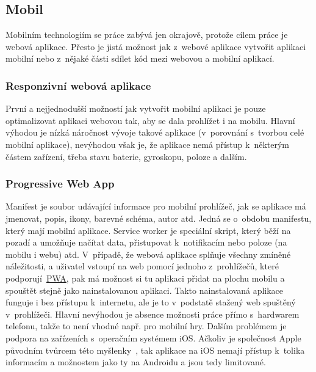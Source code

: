 \subsection{Mobil}
\label{ss:mobile}
Mobilním technologiím se práce zabývá jen okrajově, protože cílem práce je webová aplikace. Přesto je jistá možnost jak z~webové aplikace vytvořit aplikaci mobilní nebo z~nějaké části sdílet kód mezi webovou a mobilní aplikací.

\subsubsection*{Responzivní webová aplikace}
\label{sss:responsive_web_app}
První a nejjednodušší možností jak vytvořit mobilní aplikaci je pouze optimalizovat aplikaci webovou tak, aby se dala prohlížet i na mobilu. Hlavní výhodou je nízká náročnost vývoje takové aplikace (v~porovnání s~tvorbou celé mobilní aplikace), nevýhodou však je, že aplikace nemá přístup k~některým částem zařízení, třeba stavu baterie, gyroskopu, poloze a dalším.

\subsubsection*{Progressive Web App}
\label{sss:pwa}
Manifest je soubor udávající informace pro mobilní prohlížeč, jak se aplikace má jmenovat, popis, ikony, barevné schéma, autor atd. Jedná se o~obdobu manifestu, který mají mobilní aplikace. Service worker je speciální skript, který běží na pozadí a umožňuje načítat data, přistupovat k~notifikacím nebo poloze (na mobilu i webu) atd. V~případě, že webová aplikace splňuje všechny zmíněné náležitosti, a uživatel vstoupí na web pomocí jednoho z~prohlížečů, které podporují~\hyperref[sss:pwa]{PWA}, pak má možnost si tu aplikaci přidat na plochu mobilu a spouštět stejně jako nainstalovanou aplikaci. Takto nainstalovaná aplikace funguje i bez přístupu k~internetu, ale je to v~podstatě stažený web spuštěný v~prohlížeči. Hlavní nevýhodou je absence možnosti práce přímo s~hardwarem telefonu, takže to není vhodné např. pro mobilní hry. Dalším problémem je podpora na zařízeních s~operačním systémem iOS. Ačkoliv je společnost Apple původním tvůrcem této myšlenky~\cite{ritchie_2018_app}, tak aplikace na iOS nemají přístup k~tolika informacím a možnostem jako ty na Androidu a jsou tedy limitované.

